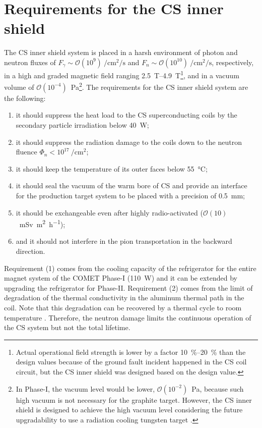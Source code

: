 \documentclass[12pt,a4paper]{article}
\begin{document}
\section{Requirements for the CS inner shield}
The CS inner shield system is placed in a harsh environment of photon and neutron fluxes of $F_\gamma \sim \mathcal{O}(10^9)~\unit{\per\square\cm\per\second}$ and $F_n \sim \mathcal{O}(10^{10})~\unit{\per\square\cm\per\second}$, respectively, in a high and graded magnetic field ranging \qtyrange{2.5}{4.9}{\tesla}\footnote{Actual operational field strength is lower by a factor \qtyrange{10}{20}{\percent} than the design values because of the ground fault incident happened in the CS coil circuit, but the CS inner shield was designed based on the design value.}, and in a vacuum volume of $\mathcal{O}(10^{-4})$~\unit{\Pa}\footnote{In Phase-I, the vacuum level would be lower, $\mathcal{O}(10^{-2})$~\unit{\Pa}, because such high vacuum is not necessary for the graphite target.  However, the CS inner shield is designed to achieve the high vacuum level considering the future upgradability to use a radiation cooling tungsten target \cite{CM46}.}. 
The requirements for the CS inner shield system are the following:
\begin{enumerate}
    \item it should suppress the heat load to the CS superconducting coils by the secondary particle irradiation below \SI{40}{\watt};
    \item it should suppress the radiation damage to the coils down to the neutron fluence $\Phi_n < 10^{17}~\unit{\per\square\cm}$;
    \item it should keep the temperature of its outer faces below \SI{55}{\degreeCelsius};
    \item it should seal the vacuum of the warm bore of CS and provide an interface for the production target system to be placed with a precision of \SI{0.5}{\mm};
    \item it should be exchangeable even after highly radio-activated ($\mathcal{O}(10)$~\unit{\milli\sievert\square\meter\per\hour});
    \item and it should not interfere in the pion transportation in the backward direction.
\end{enumerate}
Requirement (1) comes from the cooling capacity of the refrigerator for the entire magnet system of the COMET Phase-I (\SI{110}{\watt}) and it can be extended by upgrading the refrigerator for Phase-II.
Requirement (2) comes from the limit of degradation of the thermal conductivity in the aluminum thermal path in the coil. Note that this degradation can be recovered by a thermal cycle to room temperature \cite{inner-shield}. Therefore, the neutron damage limits the continuous operation of the CS system but not the total lifetime.
\end{document}
